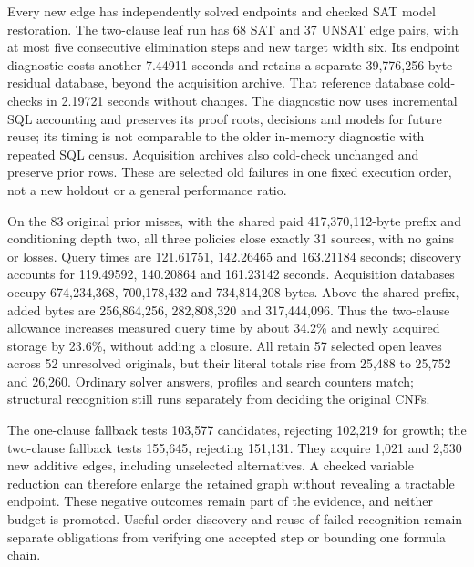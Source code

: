 \documentclass[11pt,a4paper]{article}
\numberwithin{equation}{section}
\theoremstyle{plain}
\theoremstyle{definition}
\theoremstyle{remark}
\begin{document}
Every new edge has independently solved endpoints and checked SAT model restoration. The two-clause leaf run has 68 SAT and 37 UNSAT edge pairs, with at most five consecutive elimination steps and new target width six. Its endpoint diagnostic costs another 7.44911 seconds and retains a separate 39,776,256-byte residual database, beyond the acquisition archive. That reference database cold-checks in 2.19721 seconds without changes. The diagnostic now uses incremental SQL accounting and preserves its proof roots, decisions and models for future reuse; its timing is not comparable to the older in-memory diagnostic with repeated SQL census. Acquisition archives also cold-check unchanged and preserve prior rows. These are selected old failures in one fixed execution order, not a new holdout or a general performance ratio.

On the 83 original prior misses, with the shared paid 417,370,112-byte prefix and conditioning depth two, all three policies close exactly 31 sources, with no gains or losses. Query times are 121.61751, 142.26465 and 163.21184 seconds; discovery accounts for 119.49592, 140.20864 and 161.23142 seconds. Acquisition databases occupy 674,234,368, 700,178,432 and 734,814,208 bytes. Above the shared prefix, added bytes are 256,864,256, 282,808,320 and 317,444,096. Thus the two-clause allowance increases measured query time by about 34.2\% and newly acquired storage by 23.6\%, without adding a closure. All retain 57 selected open leaves across 52 unresolved originals, but their literal totals rise from 25,488 to 25,752 and 26,260. Ordinary solver answers, profiles and search counters match; structural recognition still runs separately from deciding the original CNFs.

The one-clause fallback tests 103,577 candidates, rejecting 102,219 for growth; the two-clause fallback tests 155,645, rejecting 151,131. They acquire 1,021 and 2,530 new additive edges, including unselected alternatives. A checked variable reduction can therefore enlarge the retained graph without revealing a tractable endpoint. These negative outcomes remain part of the evidence, and neither budget is promoted. Useful order discovery and reuse of failed recognition remain separate obligations from verifying one accepted step or bounding one formula chain.
\end{document}
